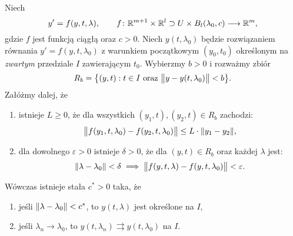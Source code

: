 %
\begin{theorem}
  Niech
%
  \begin{equation*}
    y' = f(y,t,\lambda), \qquad f \colon \R^{m+1} \times \R^l \supset U \times B_l(\lambda_0,c) \longrightarrow \R^m,
  \end{equation*}
%
  gdzie $f$ jest funkcją ciągłą oraz $c>0$. Niech $y(t,\lambda_0)$ będzie rozwiązaniem równania $y' = f(y,t,\lambda_0)$ 
  z warunkiem początkowym $(y_0,t_0)$ określonym na \emph{zwartym} przedziale $I$ zawierającym $t_0$. Wybierzmy $b > 0$ 
  i rozważmy zbiór
%
  \begin{equation*}
    R_b = \big\{ (y,t) : t \in I \text{ oraz } \norm[\big]{ y - y(t,\lambda_0) } < b \big\}.
  \end{equation*}
%
  Załóżmy dalej, że
%
  \begin{enumerate}[label=\alph*)]
    \item istnieje $L \geq 0$, że dla wszystkich $(y_1,t),(y_2,t) \in R_b$ zachodzi:
%
    \begin{equation*}
      \norm[\big]{ f(y_1,t,\lambda_0) - f(y_2,t,\lambda_0) } \leq L \cdot \norm{y_1-y_2},
    \end{equation*}
%
    \item\label{b} dla dowolnego $\varepsilon>0$ istnieje $\delta>0$, że dla $(y,t) \in R_b$ oraz każdej $\lambda$ jest:
%
    \begin{equation*}
      \norm{\lambda - \lambda_0} < \delta \implies \norm[\big]{ f(y,t,\lambda) - f(y,t,\lambda_0) } < \varepsilon.
    \end{equation*}
%
  \end{enumerate}
%
  Wówczas istnieje stała $c^{\ast} > 0$ taka, że
%
  \begin{enumerate}
    \item jeśli $\norm{\lambda-\lambda_0} < c^{\ast}$, to $y(t,\lambda)$ jest określone na $I$,
    \item jeśli $\lambda_n \to \lambda_0$, to $y(t,\lambda_n) \rightrightarrows y(t,\lambda_0)$ na $I$.
  \end{enumerate}
%
\end{theorem}
%
